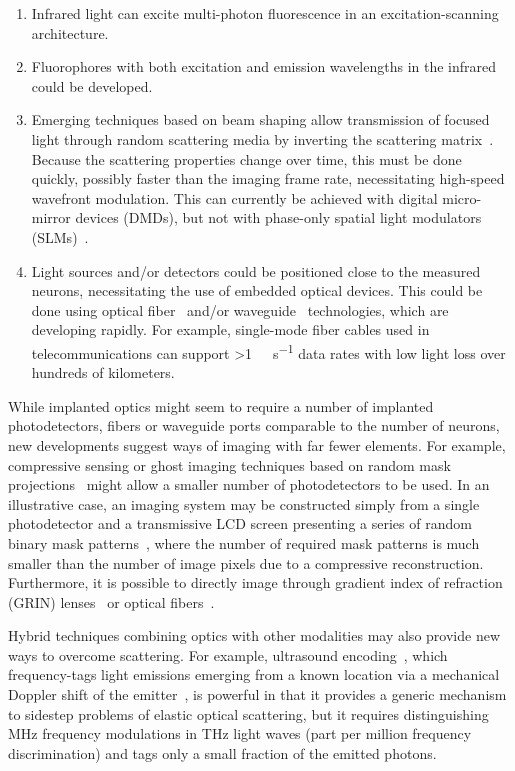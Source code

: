 \begin{enumerate}
\item Infrared light can excite multi-photon fluorescence in an excitation-scanning architecture.
\item Fluorophores with both excitation and emission wavelengths in the infrared could be developed.
\item Emerging techniques based on beam shaping allow transmission of focused light through random scattering media by inverting the scattering matrix~\cite{conkey12}.
Because the scattering properties change over time, this must be done quickly, possibly faster than the imaging frame rate, necessitating high-speed wavefront modulation.
This can currently be achieved with digital micro-mirror devices (DMDs), but not with phase-only spatial light modulators (SLMs)~\cite{alivisatos13}.
\item Light sources and/or detectors could be positioned close to the measured neurons, necessitating the use of embedded optical devices.
This could be done using optical fiber~\cite{mahalati13} and/or waveguide~\cite{zorzos10,zorzos12} technologies, which are developing rapidly.
For example, single-mode fiber cables used in telecommunications can support \SI{>1}{\tera\byte\per\second} data rates with low light loss over hundreds of kilometers.
\end{enumerate}

While implanted optics might seem to require a number of implanted photodetectors, fibers or waveguide ports comparable to the number of neurons, new developments suggest ways of imaging with far fewer elements.
For example, compressive sensing or ghost imaging techniques based on random mask projections~\cite{wakin06,studer12,tian11,sun13} might allow a smaller number of photodetectors to be used.
In an illustrative case, an imaging system may be constructed simply from a single photodetector and a transmissive LCD screen presenting a series of random binary mask patterns~\cite{huang13}, where the number of required mask patterns is much smaller than the number of image pixels due to a compressive reconstruction.
Furthermore, it is possible to directly image through gradient index of refraction (GRIN) lenses~\cite{murray12} or optical fibers~\cite{mahalati13,kang10,flusberg05}.

Hybrid techniques combining optics with other modalities may also provide new ways to overcome scattering.
For example, ultrasound encoding~\cite{wang12}, which frequency-tags light emissions emerging from a known location via a mechanical Doppler shift of the emitter~\cite{mahan98}, is powerful in that it provides a generic mechanism to sidestep problems of elastic optical scattering, but it requires distinguishing MHz frequency modulations in THz light waves (part per million frequency discrimination) and tags only a small fraction of the emitted photons.

